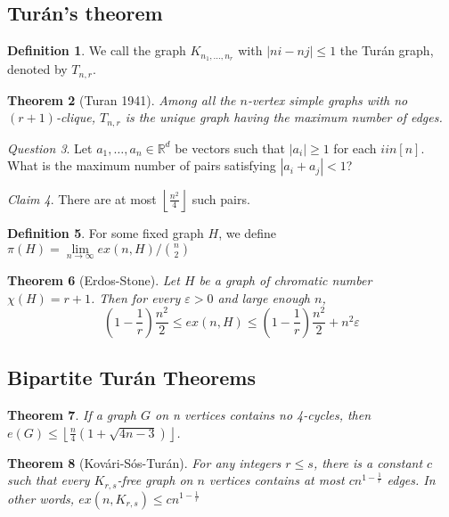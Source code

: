 \documentclass[11pt, fleqn, a4paper, landscape]{article}
\theoremstyle{plain} %
\newtheorem{thm}{Theorem}
\theoremstyle{remark} %
\newtheorem{claim}[thm]{Claim}
\newtheorem{que}[thm]{Question}
\theoremstyle{definition} %
\newtheorem{defi}[thm]{Definition}
\begin{document}
\begin{multicols}{3}
\subsection{Turán’s theorem}
\begin{defi}
We call the graph $K_{n_1,\dots,n_r}$ with $|ni - nj|\le 1$ the Turán graph, denoted by $T_{n,r}$.
\end{defi}

\begin{thm}[Turan 1941]
Among all the $n$-vertex simple graphs with no $(r + 1)$-clique, $T_{n,r}$ is
the unique graph having the maximum number of edges.
\end{thm} 

\begin{que}
Let $a_1, \dots , a_n \in \mathbb{R}^d$ be vectors such that $|a_i|\ge 1$ for each $i in [n]$. What is the maximum number of pairs satisfying $|a_i + a_j| < 1$?
\end{que}

\begin{claim}
There are at most $\left\lfloor \frac{n^2}{4}\right\rfloor$ such pairs.
\end{claim}

\begin{defi}
For some fixed graph $H$, we define $\pi(H) = \lim\limits_{n\to\infty} ex(n,H)/\binom{n}{2}$
\end{defi}

\begin{thm}[Erdos-Stone]
Let $H$ be a graph of chromatic number $\chi(H) = r + 1$. Then for
every $\varepsilon > 0$ and large enough $n$, \[\left(1-\frac{1}{r}\right)\frac{n^2}{2}\le ex(n,H)\le\left(1-\frac{1}{r}\right)\frac{n^2}{2}+n^2\varepsilon\]
\end{thm}
 \addtocounter{thm}{1}
\subsection{Bipartite Turán Theorems}

\begin{thm}
If a graph $G$ on n vertices contains no 4-cycles, then $e(G)\le\left\lfloor\frac{n}{4}(1+\sqrt{4n-3})\right\rfloor$.
\end{thm}
\addtocounter{thm}{1}
\begin{thm}[Kovári-Sós-Turán]
For any integers $r \le s$, there is a constant $c$ such that every
$K_{r,s}$-free graph on $n$ vertices contains at most $cn^{1-\frac{1}{r}}$ edges. In other words, $ex(n,K_{r,s}) \le cn^{1-\frac{1}{r}}$ 
\end{thm}


\end{multicols}
\end{document}
